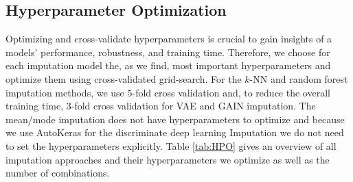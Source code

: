 





\subsection{Hyperparameter Optimization}
\label{sec:HPO}
%
Optimizing and cross-validate hyperparameters is crucial to gain insights of a models' performance, robustness, and training time. Therefore, we choose for each imputation model the, as we find, most important hyperparameters and optimize them using cross-validated grid-search. For the $k$-NN and random forest imputation methods, we use $5$-fold cross validation and, to reduce the overall training time, $3$-fold cross validation for VAE and GAIN imputation. The mean/mode imputation does not have hyperparameters to optimize and because we use AutoKeras for the discriminate deep learning Imputation we do not need to set the hyperparameters explicitly. Table \ref{tab:HPO} gives an overview of all imputation approaches and their hyperparameters we optimize as well as the number of combinations.

